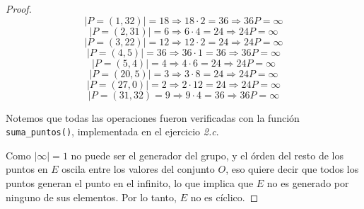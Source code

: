 \documentclass[letterpaper,11pt]{article}
\begin{document}
\begin{enumerate}
\begin{enumerate}
\begin{proof}
            \begin{equation*}
                |P = (1, 32)| = 18 \Rightarrow 18 \cdot 2 = 36 \Rightarrow 
                36P = \infty 
            \end{equation*}
            \begin{equation*}
                |P = (2, 31)| = 6 \Rightarrow 6 \cdot 4 = 24 \Rightarrow 
                24P = \infty
            \end{equation*}
            \begin{equation*}
                |P = (3, 22)| = 12 \Rightarrow 12 \cdot 2 = 24 \Rightarrow
                24P = \infty
            \end{equation*}
            \begin{equation*}
                |P = (4, 5)| = 36 \Rightarrow 36 \cdot 1 = 36 \Rightarrow
                36P = \infty
            \end{equation*}
            \begin{equation*}
                |P = (5, 4)| = 4 \Rightarrow 4 \cdot 6 = 24 \Rightarrow
                24P = \infty
            \end{equation*}
            \begin{equation*}
                |P = (20, 5)| = 3 \Rightarrow 3 \cdot 8 = 24 \Rightarrow
                24P = \infty
            \end{equation*}
            \begin{equation*}
                |P = (27, 0)| = 2 \Rightarrow 2 \cdot 12 = 24 \Rightarrow
                24P = \infty
            \end{equation*}
            \begin{equation*}
                |P = (31, 32) = 9 \Rightarrow 9 \cdot 4 = 36 \Rightarrow
                36P = \infty
            \end{equation*}
            
            Notemos que todas las operaciones fueron verificadas con la función 
            \texttt{suma\_puntos()}, implementada en el ejercicio \textit{2.c}. 
            
            Como $|\infty| = 1$ no puede ser el generador del grupo, y el órden
            del resto de los puntos en $E$ oscila entre los valores del conjunto
            $O$, eso quiere decir que todos los puntos generan el punto en el 
            infinito, lo que implica que $E$ no es generado por ninguno de sus 
            elementos. Por lo tanto, $E$ no es cíclico.
            

\end{proof}
\end{enumerate}
\end{enumerate}
\end{document}
